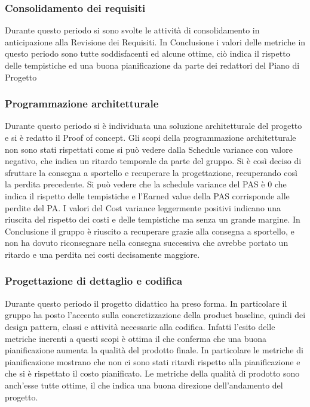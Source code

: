 \subsubsection{Consolidamento dei requisiti}
Durante questo periodo si sono svolte le attività di consolidamento in anticipazione alla Revisione dei Requisiti.
In Conclusione i valori delle metriche in questo periodo sono tutte soddisfacenti ed alcune ottime, ciò indica il rispetto delle tempistiche ed una buona pianificazione da parte dei redattori del Piano di Progetto

\subsubsection{Programmazione architetturale}
Durante questo periodo si è individuata una soluzione architetturale del progetto e si è redatto il Proof of concept.
Gli scopi della programmazione architetturale non sono stati rispettati come si può vedere dalla Schedule variance con valore negativo, che indica un ritardo temporale da parte del gruppo.
Si è così deciso di sfruttare la consegna a sportello e recuperare la progettazione, recuperando così la perdita precedente. Si può vedere che la schedule variance del PAS è 0 che indica il rispetto delle tempistiche e l'Earned value della PAS corrisponde alle perdite del PA.
I valori del Cost variance leggermente positivi indicano una riuscita del rispetto dei costi e delle tempistiche ma senza un grande margine.
In Conclusione il gruppo è riuscito a recuperare grazie alla consegna a sportello, e non ha dovuto riconsegnare nella consegna successiva che avrebbe portato un ritardo e una perdita nei costi decisamente maggiore.

\subsubsection{Progettazione di dettaglio e codifica}

Durante questo periodo il progetto didattico ha preso forma. In particolare il gruppo ha posto l'accento sulla concretizzazione della product baseline, quindi dei design pattern, classi e attività necessarie alla codifica.
Infatti l'esito delle metriche inerenti a questi scopi è ottima il che conferma che una buona pianificazione aumenta la qualità del prodotto finale.
In particolare le metriche di pianificazione mostrano che non ci sono stati ritardi rispetto alla pianificazione e che si è rispettato il costo pianificato.
Le metriche della qualità di prodotto sono anch'esse tutte ottime, il che indica una buona direzione dell'andamento del progetto.

